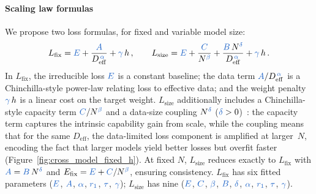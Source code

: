 \paragraph{Scaling law formulas}
We propose two loss formulas, for fixed and variable model size:
\begin{equation}\label{eq:lsize}
  L_{\mathrm{fix}} = \pp{E} + \frac{\pp{A}}{D_{\mathrm{eff}}^{\,\pp{\alpha}}} + \pp{\gamma}\,h\,,
  \qquad
  L_{\mathrm{size}} = \pp{E} + \frac{\pp{C}}{N^{\pp{\beta}}} + \frac{\pp{B} \, N^{\pp{\delta}}}{D_{\mathrm{eff}}^{\,\pp{\alpha}}} + \pp{\gamma}\,h\,.
\end{equation}
In $L_\mathrm{fix}$, the irreducible loss $\pp{E}$ is a constant baseline; the data term $\pp{A}/D_{\mathrm{eff}}^{\,\pp{\alpha}}$ is a Chinchilla-style power-law relating loss to effective data; and the weight penalty $\pp{\gamma}\,h$ is a linear cost on the target weight.
$L_\mathrm{size}$ additionally includes a Chinchilla-style capacity term $\pp{C}/N^{\pp{\beta}}$ and a data-size coupling $N^{\pp{\delta}}$ ($\pp{\delta} > 0$)~\citep{hoffmann2022training}: the capacity term captures the intrinsic capability gain from scale, while the coupling means that for the same $D_\mathrm{eff}$, the data-limited loss component is amplified at larger~$N$, encoding the fact that larger models yield better losses but overfit faster (Figure~\ref{fig:cross_model_fixed_h}).
At fixed $N$, $L_\mathrm{size}$ reduces exactly to $L_\mathrm{fix}$ with $\pp{A} = \pp{B}\,N^{\pp{\delta}}$ and $E_{\mathrm{fix}} = \pp{E} + \pp{C}/N^{\pp{\beta}}$, ensuring consistency.
$L_\mathrm{fix}$ has six fitted parameters ($\pp{E}$, $\pp{A}$, $\pp{\alpha}$, $\pp{r_1}$, $\pp{\tau}$, $\pp{\gamma}$); $L_\mathrm{size}$ has nine ($\pp{E}$, $\pp{C}$, $\pp{\beta}$, $\pp{B}$, $\pp{\delta}$, $\pp{\alpha}$, $\pp{r_1}$, $\pp{\tau}$, $\pp{\gamma}$).


